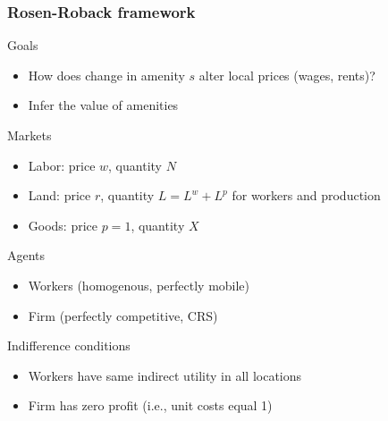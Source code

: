 \documentclass[11pt,notes=hide,aspectratio=169]{beamer}
\begin{document}
\begin{frame}
\frametitle{Rosen-Roback framework}
Goals
\begin{itemize}
\item How does change in amenity $s$ alter local prices (wages, rents)?
\item Infer the value of amenities
\end{itemize}
Markets
\begin{itemize}
\item Labor: price $w$, quantity $N$
\item Land: price $r$, quantity $L=L^w + L^p$ for workers and production
\item Goods: price $p=1$, quantity $X$
\end{itemize}
Agents
\begin{itemize}
\item Workers (homogenous, perfectly mobile)
\item Firm (perfectly competitive, CRS)
\end{itemize}
Indifference conditions
\begin{itemize}
\item Workers have same indirect utility in all locations
\item Firm has zero profit (i.e., unit costs equal 1)
\end{itemize}
\end{frame}
\end{document}
